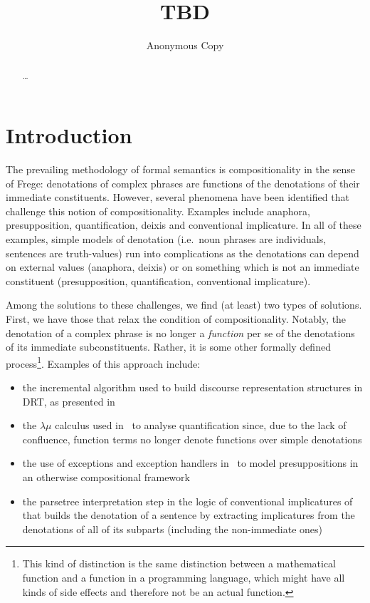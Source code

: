 \documentclass{llncs}
\begin{document}
%
\title{TBD}
%
\author{Anonymous Copy}
%

\maketitle              %

\begin{abstract}
\dots
\keywords{\dots}
\end{abstract}
%

\section{Introduction}
\label{sec:introduction}

The prevailing methodology of formal semantics is compositionality in the
sense of Frege: denotations of complex phrases are functions of the
denotations of their immediate constituents. However, several phenomena
have been identified that challenge this notion of
compositionality. Examples include anaphora, presupposition,
quantification, deixis and conventional implicature. In all of these
examples, simple models of denotation (i.e.\ noun phrases are individuals,
sentences are truth-values) run into complications as the denotations can
depend on external values (anaphora, deixis) or on something which is not
an immediate constituent (presupposition, quantification, conventional
implicature).

Among the solutions to these challenges, we find (at least) two types of
solutions. First, we have those that relax the condition of
compositionality. Notably, the denotation of a complex phrase is no longer
a \emph{function} per se of the denotations of its immediate
subconstituents. Rather, it is some other formally defined
process\footnote{This kind of distinction is the same distinction between a
  mathematical function and a function in a programming language, which
  might have all kinds of side effects and therefore not be an actual
  function.}. Examples of this approach include:

\begin{itemize}
\item the incremental algorithm used to build discourse representation
  structures in DRT, as presented in~\cite{kamp1993discourse}
\item the $\lambda\mu$ calculus used in~\cite{de2001type} to analyse
  quantification since, due to the lack of confluence, function terms no
  longer denote functions over simple denotations
\item the use of exceptions and exception handlers
  in~\cite{lebedeva2012expression} to model presuppositions in an otherwise
  compositional framework
\item the parsetree interpretation step in the logic of conventional
  implicatures of~\cite{potts2005logic} that builds the denotation of a
  sentence by extracting implicatures from the denotations of all of its
  subparts (including the non-immediate ones)
\end{itemize}
\end{document}
